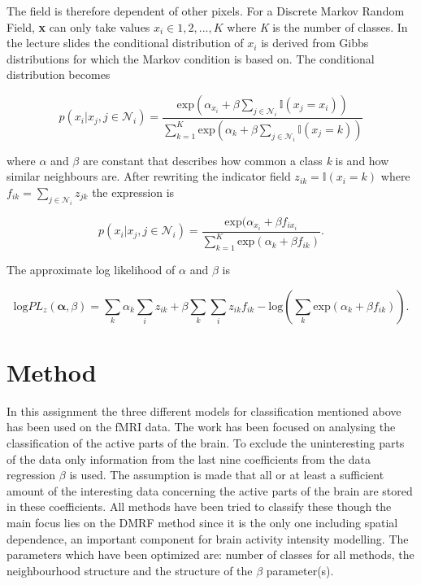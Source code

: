 \documentclass[a4paper,english]{article}
\begin{document}
The field is therefore dependent of other pixels. For a Discrete Markov Random Field, \textbf{x} can only take values $x_i \in 1,2,...,K$ where \textit{K} is the number of classes. In the lecture slides the conditional distribution of $x_i$ is derived from Gibbs distributions for which the Markov condition is based on. The conditional distribution becomes

\begin{equation}
p(x_i|x_j,j\in \mathcal{N}_i) = \dfrac{\text{exp}(\alpha_{x_i}+\beta\sum_{j\in \mathcal{N}_i}\mathds{I}(x_j = x_i))}{\sum^K_{k=1}\text{exp}(\alpha_k + \beta\sum_{j\in \mathcal{N}_i}\mathds{I}(x_j = k))}
\end{equation}

where $\alpha$ and $\beta$ are constant that describes how common a class \textit{k} is and how similar neighbours are. After rewriting the indicator field $z_{ik} = \mathds{I}(x_i = k)$ where $f_{ik} = \sum_{j\in \mathcal{N}_i} z_{jk}$ the expression is

\begin{equation}
p(x_i|x_j,j\in \mathcal{N}_i) = \dfrac{\text{exp}(\alpha_{x_i}+\beta f_{ix_i} }{\sum^K_{k=1}\text{exp}(\alpha_k + \beta f_{ik})}.
\end{equation}

The approximate log likelihood of $\alpha$ and $\beta$ is

\begin{equation}
	\text{log} PL_z(\boldsymbol{\alpha},\beta) = \sum_k \alpha_k \sum_i z_{ik} + \beta \sum_k \sum_i z_{ik}f_{ik} - \text{log}(\sum_k \text{exp}(\alpha_k + \beta f_{ik})).
\end{equation}



\section{Method}
In this assignment the three different models for classification mentioned above has been used on the fMRI data.
The work has been focused on analysing the classification of the active parts of the brain.
To exclude the uninteresting parts of the data only information from the last nine coefficients from the data regression $\beta$ is used.
The assumption is made that all or at least a sufficient amount of the interesting data concerning the active parts of the brain are stored in these coefficients.
All methods have been tried to classify these though the main focus lies on the DMRF method since it is the only one including spatial dependence, an important component for brain activity intensity modelling.
The parameters which have been optimized are: number of classes for all methods, the neighbourhood structure and the structure of the $\beta$ parameter(s).
\end{document}
